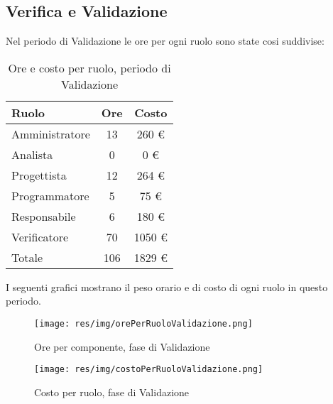 \subsection{Verifica e Validazione}
Nel periodo di Validazione le ore per ogni ruolo sono state cosi suddivise:

\begin{table}[H]
	\centering
	\begin{tabular}{ l c c }
		\textbf{Ruolo} & \textbf{Ore} & \textbf{Costo} \\
		\hline
		Amministratore & 13 & 260 \euro \\
		Analista & 0 & 0 \euro \\
		Progettista & 12 & 264 \euro \\
		Programmatore & 5 & 75 \euro \\
		Responsabile & 6 & 180 \euro \\
		Verificatore & 70 & 1050 \euro \\
		\hline
		Totale & 106 & 1829 \euro \\
		\hline
	\end{tabular}
	\caption{Ore e costo per ruolo, periodo di Validazione}
\end{table}

I seguenti grafici mostrano il peso orario e di costo di ogni ruolo in questo periodo.

\begin{figure}[H]
  \begin{center}
    \texttt{[image: res/img/orePerRuoloValidazione.png]}
  \caption{Ore per componente, fase di Validazione}
  \end{center} 
\end{figure}  

\begin{figure}[H]
  \begin{center}
    \texttt{[image: res/img/costoPerRuoloValidazione.png]}
  \caption{Costo per ruolo, fase di Validazione}
  \end{center} 
\end{figure}  


